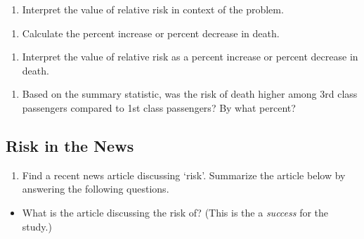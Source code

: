 \documentclass[
]{report}
\providecommand{\tightlist}{%
  \setlength{\itemsep}{0pt}\setlength{\parskip}{0pt}}
\begin{document}
\vspace{0.8in}

\begin{enumerate}
\def\labelenumi{\arabic{enumi}.}
\setcounter{enumi}{10}
\tightlist
\item
  Interpret the value of relative risk in context of the problem.
\end{enumerate}

\vspace{0.8in}

\begin{enumerate}
\def\labelenumi{\arabic{enumi}.}
\setcounter{enumi}{11}
\tightlist
\item
  Calculate the percent increase or percent decrease in death.
\end{enumerate}

\vspace{0.5in}

\begin{enumerate}
\def\labelenumi{\arabic{enumi}.}
\setcounter{enumi}{12}
\tightlist
\item
  Interpret the value of relative risk as a percent increase or percent decrease in death.
\end{enumerate}

\vspace{0.8in}

\begin{enumerate}
\def\labelenumi{\arabic{enumi}.}
\setcounter{enumi}{13}
\tightlist
\item
  Based on the summary statistic, was the risk of death higher among 3rd class passengers compared to 1st class passengers? By what percent?
\end{enumerate}

\vspace{0.8in}

\hypertarget{risk-in-the-news}{%
\subsection{Risk in the News}\label{risk-in-the-news}}

\begin{enumerate}
\def\labelenumi{\arabic{enumi}.}
\setcounter{enumi}{14}
\tightlist
\item
  Find a recent news article discussing `risk'. Summarize the article below by answering the following questions.
\end{enumerate}

\begin{itemize}
\tightlist
\item
  What is the article discussing the risk of? (This is the a \emph{success} for the study.)
\end{itemize}
\end{document}
